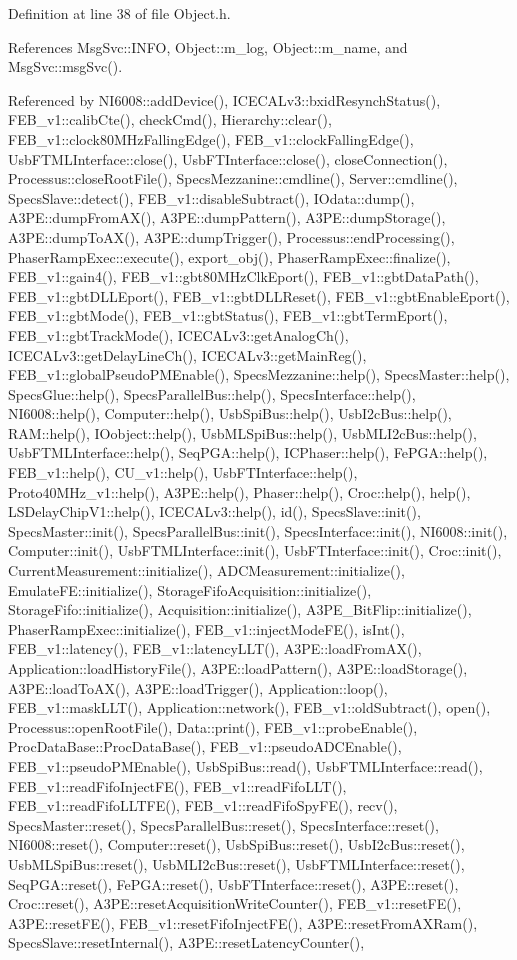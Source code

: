 Definition at line 38 of file Object.h.

References MsgSvc::INFO, Object::m\_\-log, Object::m\_\-name, and MsgSvc::msgSvc().

Referenced by NI6008::addDevice(), ICECALv3::bxidResynchStatus(), FEB\_\-v1::calibCte(), checkCmd(), Hierarchy::clear(), FEB\_\-v1::clock80MHzFallingEdge(), FEB\_\-v1::clockFallingEdge(), UsbFTMLInterface::close(), UsbFTInterface::close(), closeConnection(), Processus::closeRootFile(), SpecsMezzanine::cmdline(), Server::cmdline(), SpecsSlave::detect(), FEB\_\-v1::disableSubtract(), IOdata::dump(), A3PE::dumpFromAX(), A3PE::dumpPattern(), A3PE::dumpStorage(), A3PE::dumpToAX(), A3PE::dumpTrigger(), Processus::endProcessing(), PhaserRampExec::execute(), export\_\-obj(), PhaserRampExec::finalize(), FEB\_\-v1::gain4(), FEB\_\-v1::gbt80MHzClkEport(), FEB\_\-v1::gbtDataPath(), FEB\_\-v1::gbtDLLEport(), FEB\_\-v1::gbtDLLReset(), FEB\_\-v1::gbtEnableEport(), FEB\_\-v1::gbtMode(), FEB\_\-v1::gbtStatus(), FEB\_\-v1::gbtTermEport(), FEB\_\-v1::gbtTrackMode(), ICECALv3::getAnalogCh(), ICECALv3::getDelayLineCh(), ICECALv3::getMainReg(), FEB\_\-v1::globalPseudoPMEnable(), SpecsMezzanine::help(), SpecsMaster::help(), SpecsGlue::help(), SpecsParallelBus::help(), SpecsInterface::help(), NI6008::help(), Computer::help(), UsbSpiBus::help(), UsbI2cBus::help(), RAM::help(), IOobject::help(), UsbMLSpiBus::help(), UsbMLI2cBus::help(), UsbFTMLInterface::help(), SeqPGA::help(), ICPhaser::help(), FePGA::help(), FEB\_\-v1::help(), CU\_\-v1::help(), UsbFTInterface::help(), Proto40MHz\_\-v1::help(), A3PE::help(), Phaser::help(), Croc::help(), help(), LSDelayChipV1::help(), ICECALv3::help(), id(), SpecsSlave::init(), SpecsMaster::init(), SpecsParallelBus::init(), SpecsInterface::init(), NI6008::init(), Computer::init(), UsbFTMLInterface::init(), UsbFTInterface::init(), Croc::init(), CurrentMeasurement::initialize(), ADCMeasurement::initialize(), EmulateFE::initialize(), StorageFifoAcquisition::initialize(), StorageFifo::initialize(), Acquisition::initialize(), A3PE\_\-BitFlip::initialize(), PhaserRampExec::initialize(), FEB\_\-v1::injectModeFE(), isInt(), FEB\_\-v1::latency(), FEB\_\-v1::latencyLLT(), A3PE::loadFromAX(), Application::loadHistoryFile(), A3PE::loadPattern(), A3PE::loadStorage(), A3PE::loadToAX(), A3PE::loadTrigger(), Application::loop(), FEB\_\-v1::maskLLT(), Application::network(), FEB\_\-v1::oldSubtract(), open(), Processus::openRootFile(), Data::print(), FEB\_\-v1::probeEnable(), ProcDataBase::ProcDataBase(), FEB\_\-v1::pseudoADCEnable(), FEB\_\-v1::pseudoPMEnable(), UsbSpiBus::read(), UsbFTMLInterface::read(), FEB\_\-v1::readFifoInjectFE(), FEB\_\-v1::readFifoLLT(), FEB\_\-v1::readFifoLLTFE(), FEB\_\-v1::readFifoSpyFE(), recv(), SpecsMaster::reset(), SpecsParallelBus::reset(), SpecsInterface::reset(), NI6008::reset(), Computer::reset(), UsbSpiBus::reset(), UsbI2cBus::reset(), UsbMLSpiBus::reset(), UsbMLI2cBus::reset(), UsbFTMLInterface::reset(), SeqPGA::reset(), FePGA::reset(), UsbFTInterface::reset(), A3PE::reset(), Croc::reset(), A3PE::resetAcquisitionWriteCounter(), FEB\_\-v1::resetFE(), A3PE::resetFE(), FEB\_\-v1::resetFifoInjectFE(), A3PE::resetFromAXRam(), SpecsSlave::resetInternal(), A3PE::resetLatencyCounter(), 